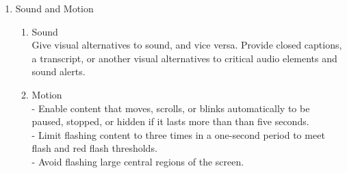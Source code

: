\documentclass[12pt]{article}
\begin{document}
{{\begin{enumerate}
\begin{enumerate}
       \item Contrast ratios \\
       Contrast ratios represent how different a color is from another color, commonly written as 1:1 or 21:1
       \begin{enumerate}
         \item Small text should have a contrast ratio of at least 4.5:1 against its background.
         \item Large text (at 14 pt bold/18 pt regular and up) should have a contrast ratio of at least 3:1 against its background.
         \item Icons or other critical elements should also use the above recommended contrast ratios.

       \end{enumerate}
       \item{For users who are colorblind, or cannot see differences in color, include design elements in addition to color that ensure they receive the same amount of information. Use multiple visual cues to communicate important states. Use elements such as strokes, indicators, patterns, texture, or text to describe actions and content.}
     \end{enumerate}
    \item{Sound and Motion}
    	\begin{enumerate}
        	\item{Sound\\Give visual alternatives to sound, and vice versa. Provide closed captions, a transcript, or another visual alternatives to critical audio elements and sound alerts.}
            \item{Motion\\- Enable content that moves, scrolls, or blinks automatically to be paused, stopped, or hidden if it lasts more than than five seconds.\\
- Limit flashing content to three times in a one-second period to meet flash and red flash thresholds.\\
- Avoid flashing large central regions of the screen.}
        \end{enumerate}


\end{enumerate}}}
\end{document}
